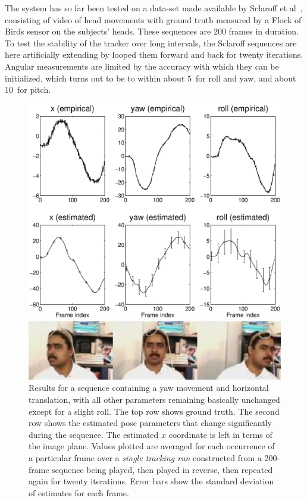 The system has so far been tested on a data-set made available by
Sclaroff et al~\cite{lacascia00fast}, consisting of video of head
movements with ground truth measured by a Flock of Birds sensor on the
subjects' heads.  These sequences are 200 frames in duration.  To test
the stability of the tracker over long intervals, the Sclaroff
sequences are here artificially extending by looped them forward and
back for twenty iterations.  Angular measurements are limited by the
accuracy with which they can be initialized, which turns out to be to
within about 5\dgrs\ for roll and yaw, and about 10\dgrs\ for pitch.

\begin{figure}[tbp]
\centerline{\includegraphics[width=\columnwidth]{yaw-roll-result.eps}}
\centerline{\includegraphics[width=\columnwidth]{yaw-extremes.eps}}
\caption{ 
%
  Results for a sequence containing a yaw movement and horizontal
  translation, with all other parameters remaining basically unchanged
  except for a slight roll.  The top row shows ground truth.  The
  second row shows the estimated pose parameters that change
  significantly during the sequence.  The estimated $x$ coordinate is
  left in terms of the image plane.  Values plotted are averaged for
  each occurrence of a particular frame over a {\em single tracking
    run} constructed from a 200-frame sequence being played, then
  played in reverse, then repeated again for twenty iterations.  Error
  bars show the standard deviation of estimates for each frame.
%
}
\label{fig:yaw-roll-result}
\end{figure}
